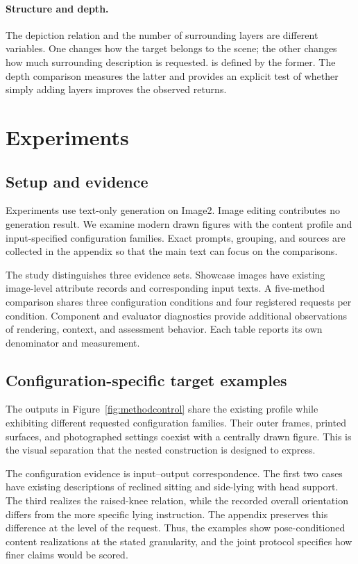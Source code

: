 \paragraph{Structure and depth.}
The depiction relation and the number of surrounding layers are different variables. One changes how the target belongs to the scene; the other changes how much surrounding description is requested. \inception{} is defined by the former. The depth comparison measures the latter and provides an explicit test of whether simply adding layers improves the observed returns.

\section{Experiments}
\label{sec:experiments}
\subsection{Setup and evidence}
Experiments use text-only generation on Image2. Image editing contributes no generation result. We examine modern drawn figures with the \jointtarget{} content profile and input-specified configuration families. Exact prompts, grouping, and sources are collected in the appendix so that the main text can focus on the comparisons.

The study distinguishes three evidence sets. Showcase images have existing image-level attribute records and corresponding input texts. A five-method comparison shares three configuration conditions and four registered requests per condition. Component and evaluator diagnostics provide additional observations of rendering, context, and assessment behavior. Each table reports its own denominator and measurement.

\subsection{Configuration-specific target examples}
The outputs in Figure~\ref{fig:methodcontrol} share the existing profile \jointtarget{} while exhibiting different requested configuration families. Their outer frames, printed surfaces, and photographed settings coexist with a centrally drawn figure. This is the visual separation that the nested construction is designed to express.

The configuration evidence is input--output correspondence. The first two cases have existing descriptions of reclined sitting and side-lying with head support. The third realizes the raised-knee relation, while the recorded overall orientation differs from the more specific lying instruction. The appendix preserves this difference at the level of the request. Thus, the examples show pose-conditioned content realizations at the stated granularity, and the joint protocol specifies how finer claims would be scored.

